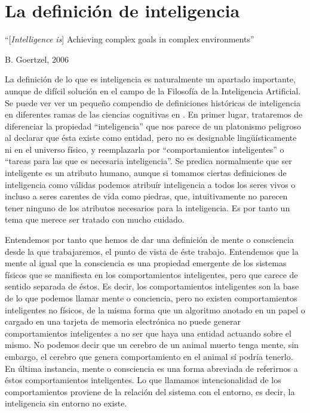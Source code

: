 \documentclass[12pt]{memoir}
\begin{document}
\chapter{La definición de inteligencia}

\epigraph{``[\textit{Intelligence is}] Achieving complex goals in complex environments''}{B. Goertzel, 2006}

La definición de lo que es inteligencia es naturalmente un apartado importante, aunque de difícil solución en el campo de la Filosofía de la Inteligencia Artificial. Se puede ver ver un pequeño compendio de definiciones históricas de inteligencia en diferentes ramas de las ciencias cognitivas en \cite{intDefs}. En primer lugar, trataremos de diferenciar la propiedad ``inteligencia'' que nos parece de un platonismo peligroso al declarar que ésta existe como entidad, pero no es designable lingüísticamente ni en el universo físico, y reemplazarla por ``comportamientos inteligentes'' o ``tareas para las que es necesaria inteligencia''. Se predica normalmente que ser inteligente es un atributo humano, aunque si tomamos ciertas definiciones de inteligencia como válidas podemos atribuír inteligencia a todos los seres vivos o incluso a seres carentes de vida como piedras, que, intuitivamente no parecen tener ninguno de los atributos necesarios para la inteligencia. Es por tanto un tema que merece ser tratado con mucho cuidado.

Entendemos por tanto que hemos de dar una definición de mente o consciencia desde la que trabajaremos, el punto de vista de éste trabajo. Entendemos que la mente al igual que la consciencia es una propiedad emergente de los sistemas físicos que se manifiesta en los comportamientos inteligentes, pero que carece de sentido separada de éstos. Es decir, los comportamientos inteligentes son la base de lo que podemos llamar mente o conciencia, pero no existen comportamientos inteligentes no físicos, de la misma forma que un algoritmo anotado en un papel o cargado en una tarjeta de memoria electrónica no puede generar comportamientos inteligentes a no ser que haya una entidad actuando sobre el mismo. No podemos decir que un cerebro de un animal muerto tenga mente, sin embargo, el cerebro que genera comportamiento en el animal sí podría tenerlo. En última instancia, mente o consciencia es una forma abreviada de referirnos a éstos comportamientos inteligentes. Lo que llamamos intencionalidad de los comportamientos proviene de la relación del sistema con el entorno, es decir, la inteligencia sin entorno no existe.
\end{document}
